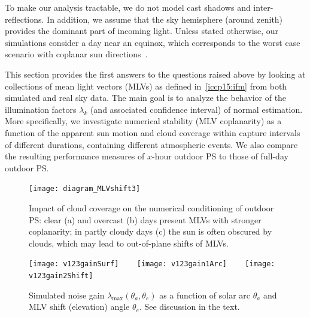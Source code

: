 To make our analysis tractable, we do not model cast shadows and inter-reflections. In addition, we assume that the sky hemisphere (around zenith) provides the dominant part of incoming light. Unless stated otherwise, our simulations consider a day near an equinox, which corresponds to the worst case scenario with coplanar sun directions~\cite{shen-pg-14}.

This section provides the first answers to the questions raised above by looking at collections of mean light vectors (MLVs) as defined in~\ref{iccp15:ifm} from both simulated and real sky data. The main goal is to analyze the behavior of the illumination factors $\lambda_k$ (and associated confidence interval) of normal estimation. More specifically, we investigate numerical stability (MLV coplanarity) as a function of the apparent sun motion and cloud coverage within capture intervals of different durations, containing different atmospheric events. We also compare the resulting performance measures of $x$-hour outdoor PS to those of full-day outdoor PS.


\begin{figure}[t]
\centering
\texttt{[image: diagram\_MLVshift3]}
\caption[Impact of cloud coverage on PS conditioning]{Impact of cloud coverage on the numerical conditioning of outdoor PS: clear (a) and overcast (b) days present MLVs with stronger coplanarity; in partly cloudy days (c) the sun is often obscured by clouds, which may lead to out-of-plane shifts of MLVs.}
\label{fig:MLVshift}
\end{figure}
\begin{figure}[t]
\centering
\texttt{[image: v123gainSurf]} \ \ \ %
\texttt{[image: v123gain1Arc]} \ \ \ %
\texttt{[image: v123gain2Shift]}
\caption[Simulated noise gain as function of solar arc and mean light vector shift]{Simulated noise gain $\lambda_{\max}(\theta_a,\theta_e)$ as a function of solar arc $\theta_a$ and MLV shift (elevation) angle $\theta_e$. See discussion in the text.}
\label{fig:v123gain}
\end{figure}

